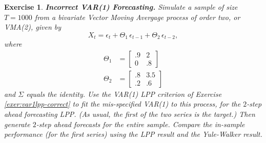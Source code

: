 \documentclass[a4paper]{book}
\newtheorem{Exercise}{Exercise}
\begin{document}
\begin{Exercise} {\bf Incorrect VAR(1) Forecasting.} \rm
\label{exer:var1lpp-incorrect.fore}
 Simulate a sample of size $T=1000$ from
 a bivariate Vector Moving Avergage process of order two, or VMA(2), given by
\[
  X_t = \epsilon_t + \Theta_1 \, \epsilon_{t-1} + \Theta_2 \, \epsilon_{t-2},
\]
  where
\begin{align*}
 \Theta_1 & = \left[ \begin{array}{ll} .9 & 2 \\ 0 & .8 \end{array} \right] \\
 \Theta_2 & = \left[ \begin{array}{ll} .8 & 3.5 \\ .2 & .6 \end{array} \right] 
\end{align*}
  and $\Sigma$ equals the identity.  Use the VAR(1) LPP criterion of   
 Exercise \ref{exer:var1lpp-correct}  to 
 fit the mis-specified VAR(1) to this process, for   the $2$-step ahead forecasting
 LPP.  (As usual, the first of the two series is the target.)
 Then generate $2$-step ahead forecasts for the entire sample.  Compare the in-sample 
 performance  (for the first series) using the LPP result and the Yule-Walker result.
\end{Exercise}
\end{document}
